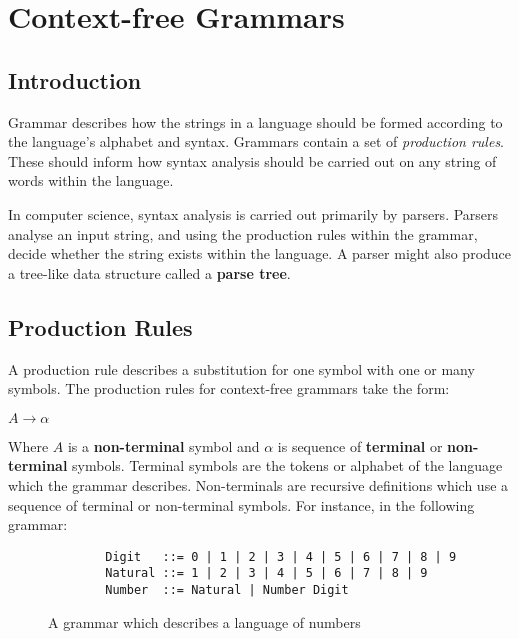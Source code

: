 \section{Context-free Grammars}

\subsection{Introduction}

Grammar describes how the strings in a language should be formed according to the language's alphabet and syntax. Grammars contain a set of \textit{production rules}. These should inform how syntax analysis should be carried out on any string of words within the language.

In computer science, syntax analysis is carried out primarily by parsers. Parsers analyse an input string, and using the production rules within the grammar, decide whether the string exists within the language. A parser might also produce a tree-like data structure called a \textbf{parse tree}.

\subsection{Production Rules}

A production rule describes a substitution for one symbol with one or many symbols\textsuperscript{\cite{scott_johnstone_1998}}. The production rules for context-free grammars take the form:

\begin{center}
    $A \rightarrow \alpha$
\end{center}

Where $A$ is a \textbf{non-terminal} symbol and $\alpha$ is sequence of \textbf{terminal} or \textbf{non-terminal} symbols. Terminal symbols are the tokens or alphabet of the language which the grammar describes. Non-terminals are recursive definitions which use a sequence of terminal or non-terminal symbols\textsuperscript{\cite{barbosa_2018}}. For instance, in the following grammar:

\begin{figure}[h]
    \begin{center}    
        \begin{verbatim}
        Digit   ::= 0 | 1 | 2 | 3 | 4 | 5 | 6 | 7 | 8 | 9
        Natural ::= 1 | 2 | 3 | 4 | 5 | 6 | 7 | 8 | 9
        Number  ::= Natural | Number Digit
        \end{verbatim}
        \vspace{-1.5em}
    \end{center}
    \caption{\label{fig:3.1}A grammar which describes a language of numbers}
\end{figure}

